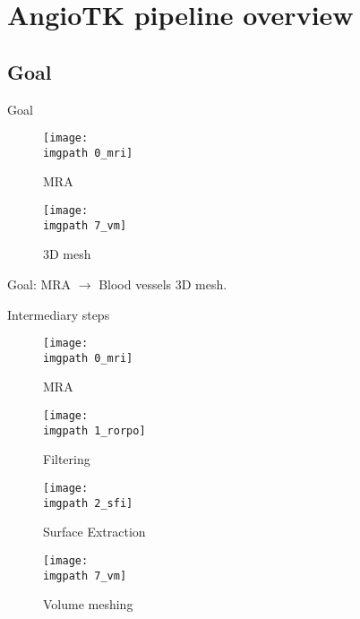 \section{AngioTK pipeline overview}
\subsection{Goal}


\begin{frame}{Goal}
 \begin{center}
 \begin{figure}[H]
	\begin{minipage}[b]{0.49\linewidth}
            	\centering
            	\texttt{[image: \\imgpath 0\_mri]}
		\caption*{MRA}
	\end{minipage}
	\hfill
	\begin{minipage}[b]{0.49\linewidth}
            	\centering
            	\texttt{[image: \\imgpath 7\_vm]}
		\caption*{3D mesh}
	\end{minipage}
 \end{figure}
 	\vfill
	Goal: MRA $\rightarrow$ Blood vessels 3D mesh.
 \end{center}
\end{frame}


\newcommand{\imgWidth}{.48\linewidth}

\begin{frame}{Intermediary steps}
 \begin{center}
 \begin{figure}[H]
 	\hfill
	\begin{minipage}[b]{\imgWidth}
            	\centering
            	\texttt{[image: \\imgpath 0\_mri]}
		\caption*{MRA}
	\end{minipage}
	\begin{minipage}[b]{\imgWidth}
            	\centering
            	\texttt{[image: \\imgpath 1\_rorpo]}
		\caption*{Filtering}
	\end{minipage}
	\hfill \hfill
	
	\hfill
	\begin{minipage}[b]{\imgWidth}
            	\centering
            	\texttt{[image: \\imgpath 2\_sfi]}
		\caption*{Surface Extraction}
	\end{minipage}
	\begin{minipage}[b]{\imgWidth}
            	\centering
            	\texttt{[image: \\imgpath 7\_vm]}
		\caption*{Volume meshing}
	\end{minipage}
	\hfill \hfill
 \end{figure}
 \end{center}
\end{frame}

